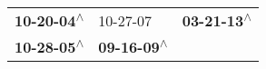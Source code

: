 \begin{supertabular}{lll}
 \textbf{10-20-04\textsuperscript{$\wedge$}} &                   10-27-07\textsuperscript{} &  \textbf{03-21-13\textsuperscript{$\wedge$}} \\
 \textbf{10-28-05\textsuperscript{$\wedge$}} &  \textbf{09-16-09\textsuperscript{$\wedge$}} &                                              \\
\end{supertabular}
